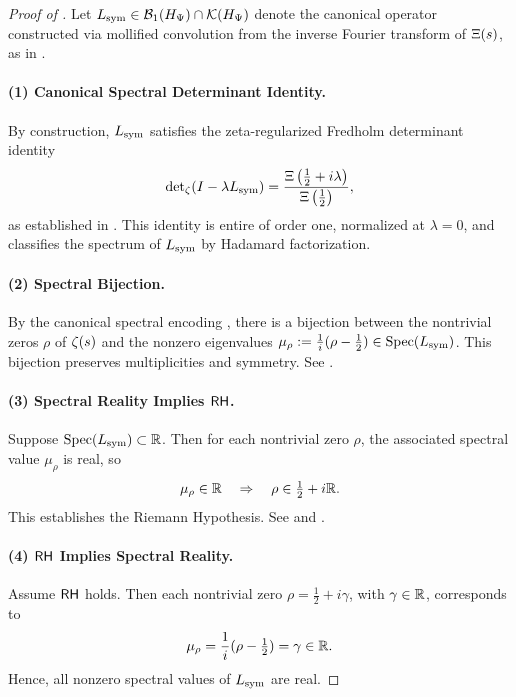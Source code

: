 \begin{proof}[Proof of ]
Let \( L_{\mathrm{sym}} \in \mathcal{B}_1(H_{\Psi}) \cap \mathcal{K}(H_{\Psi}) \) denote the canonical operator constructed via mollified convolution from the inverse Fourier transform of \( \Xi(s) \), as in .

\paragraph{(1) Canonical Spectral Determinant Identity.}
By construction, \( L_{\mathrm{sym}} \) satisfies the zeta-regularized Fredholm determinant identity
\[
\det\nolimits_{\zeta}(I - \lambda L_{\mathrm{sym}}) = \frac{\Xi\left(\tfrac{1}{2} + i\lambda\right)}{\Xi\left(\tfrac{1}{2}\right)},
\]
as established in . This identity is entire of order one, normalized at \( \lambda = 0 \), and classifies the spectrum of \( L_{\mathrm{sym}} \) by Hadamard factorization.

\paragraph{(2) Spectral Bijection.}
By the canonical spectral encoding , there is a bijection between the nontrivial zeros \( \rho \) of \( \zeta(s) \) and the nonzero eigenvalues \( \mu_\rho := \frac{1}{i}(\rho - \tfrac{1}{2}) \in \operatorname{Spec}(L_{\mathrm{sym}}) \). This bijection preserves multiplicities and symmetry. See .

\paragraph{(3) Spectral Reality Implies \(\mathsf{RH}\).}
Suppose \( \operatorname{Spec}(L_{\mathrm{sym}}) \subset \mathbb{R} \). Then for each nontrivial zero \( \rho \), the associated spectral value \( \mu_\rho \) is real, so
\[
\mu_\rho \in \mathbb{R} \quad \Rightarrow \quad \rho \in \tfrac{1}{2} + i\mathbb{R}.
\]
This establishes the Riemann Hypothesis. See  and .

\paragraph{(4) \(\mathsf{RH}\) Implies Spectral Reality.}
Assume \(\mathsf{RH}\) holds. Then each nontrivial zero \( \rho = \tfrac{1}{2} + i\gamma \), with \( \gamma \in \mathbb{R} \), corresponds to
\[
\mu_\rho = \frac{1}{i}(\rho - \tfrac{1}{2}) = \gamma \in \mathbb{R}.
\]
Hence, all nonzero spectral values of \( L_{\mathrm{sym}} \) are real.


\end{proof}
